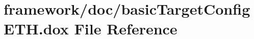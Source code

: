 \hypertarget{basic_target_config_e_t_h_8dox}{}\section{framework/doc/basic\+Target\+Config\+E\+TH.dox File Reference}
\label{basic_target_config_e_t_h_8dox}
